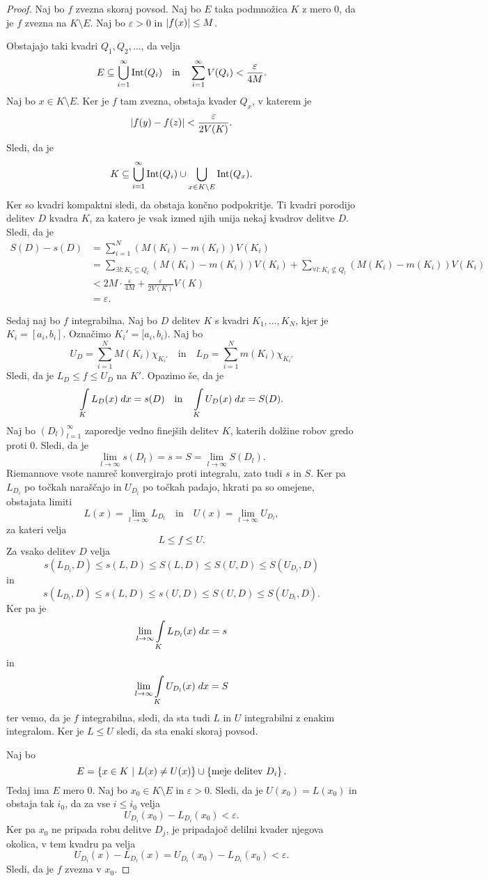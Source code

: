 \begin{proof}
Naj bo $f$ zvezna skoraj povsod. Naj bo $E$ taka podmnožica $K$ z
mero $0$, da je $f$ zvezna na $K \setminus E$. Naj bo
$\varepsilon > 0$ in $\left\lvert f(x)\right\rvert \leq M$.

Obstajajo taki kvadri $Q_1,Q_2,\dots$, da velja
\[
E \subseteq \bigcup_{i=1}^\infty \operatorname{Int}(Q_i)
\quad \text{in} \quad
\sum_{i=1}^\infty V(Q_i) < \frac{\varepsilon}{4M}.
\]
Naj bo $x \in K \setminus E$. Ker je $f$ tam zvezna, obstaja kvader
$Q_x$, v katerem je
\[
\left\lvert f(y)-f(z)\right\rvert < \frac{\varepsilon}{2 V(K)}.
\]
Sledi, da je
\[
K \subseteq
\bigcup_{i=1}^\infty \operatorname{Int}(Q_i) \cup
\bigcup_{x \in K \setminus E} \operatorname{Int}(Q_x).
\]
Ker so kvadri kompaktni sledi, da obstaja končno podpokritje. Ti
kvadri porodijo delitev $D$ kvadra $K$, za katero je vsak izmed
njih unija nekaj kvadrov delitve $D$. Sledi, da je
\begin{align*}
S(D) - s(D) &=
\sum_{i=1}^N (M(K_i)-m(K_i)) V(K_i)
\\
&=
\sum_{\exists l \colon K_i \subseteq Q_l}(M(K_i)-m(K_i)) V(K_i) +
\sum_{\forall l \colon K_i \not\subseteq Q_l}(M(K_i)-m(K_i)) V(K_i)
\\
&<
2M \cdot \frac{\varepsilon}{4M} + \frac{\varepsilon}{2 V(K)} V(K)
\\
&=
\varepsilon.
\end{align*}

Sedaj naj bo $f$ integrabilna. Naj bo $D$ delitev $K$ s kvadri
$K_1,\dots,K_N$, kjer je $K_i = [a_i,b_i]$. Označimo
$K_i' = [a_i,b_i)$. Naj bo
\[
U_D = \sum_{i=1}^N M(K_i) \chi_{K_i'}
\quad \text{in} \quad
L_D = \sum_{i=1}^N m(K_i) \chi_{K_i'}
\]
Sledi, da je $L_D \leq f \leq U_D$ na $K'$. Opazimo še, da je
\[
\int\limits_K L_D(x)\;dx = s(D)
\quad \text{in} \quad
\int\limits_K U_D(x)\;dx = S(D).
\]
Naj bo $(D_l)_{l=1}^\infty$ zaporedje vedno finejših delitev $K$,
katerih dolžine robov gredo proti $0$. Sledi, da je
\[
\lim_{l \to \infty} s(D_l) = s = S = \lim_{l \to \infty} S(D_l).
\]
Riemannove vsote namreč konvergirajo proti integralu, zato tudi
$s$ in $S$. Ker pa $L_{D_i}$ po točkah naraščajo in $U_{D_l}$ po
točkah padajo, hkrati pa so omejene, obstajata limiti
\[
L(x) = \lim_{l \to \infty} L_{D_l}
\quad \text{in} \quad
U(x) = \lim_{l \to \infty} U_{D_l},
\]
za kateri velja
\[
L \leq f \leq U.
\]
Za vsako delitev $D$ velja
\[
s(L_{D_l},D) \leq s(L,D) \leq S(L,D) \leq S(U,D) \leq S(U_{D_l},D)
\]
in
\[
s(L_{D_l},D) \leq s(L,D) \leq s(U,D) \leq S(U,D) \leq S(U_{D_l},D).
\]
Ker pa je
\[
\lim_{l \to \infty} \int\limits_K L_{D_l}(x)\;dx = s
\]
in
\[
\lim_{l \to \infty} \int\limits_K U_{D_l}(x)\;dx = S
\]
ter vemo, da je $f$ integrabilna, sledi, da sta tudi $L$ in $U$
integrabilni z enakim integralom. Ker je $L \leq U$ sledi, da sta
enaki skoraj povsod.

Naj bo
\[
E =
\left\{x \in K~\middle\vert~L(x) \ne U(x)\right\} \cup \left\{\text{meje delitev $D_i$}\right\}.
\]
Tedaj ima $E$ mero $0$. Naj bo $x_0 \in K \setminus E$ in
$\varepsilon > 0$. Sledi, da je $U(x_0) = L(x_0)$ in obstaja tak
$i_0$, da za vse $i \leq i_0$ velja
\[
U_{D_i}(x_0) - L_{D_i}(x_0) < \varepsilon.
\]
Ker pa $x_0$ ne pripada robu delitve $D_j$, je pripadajoč delilni
kvader njegova okolica, v tem kvadru pa velja
\[
U_{D_i}(x)-L_{D_i}(x) = U_{D_i}(x_0)-L_{D_i}(x_0) < \varepsilon.
\]
Sledi, da je $f$ zvezna v $x_0$.
\end{proof}

